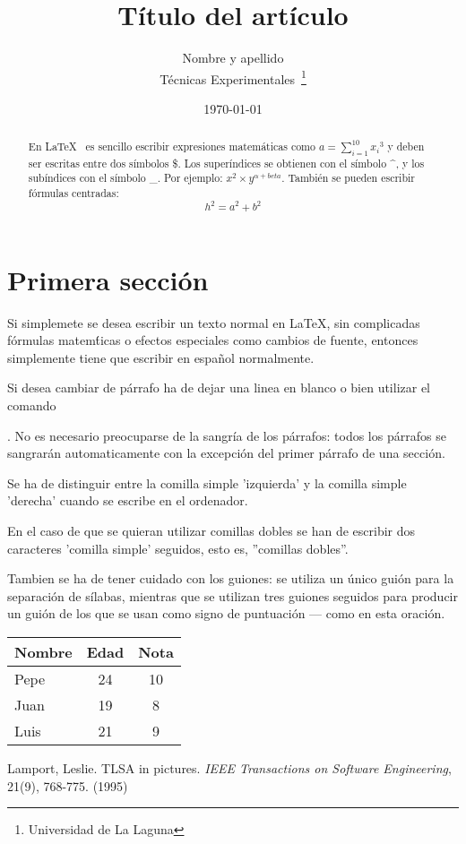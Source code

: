 \documentclass[a4paper,12pt]{article}
\begin{document}
\title{Título del artículo}
\author{Nombre y apellido \\
        Técnicas Experimentales~\footnote{Universidad de La Laguna}
        }
\date {\today}
\maketitle
\begin{abstract}
  En \LaTeX{}~\cite{Lam:86} es sencillo escribir expresiones
  matemáticas como $a=\sum_{i=1}^{10} {x_i}^{3}$
  y deben ser escritas entre dos símbolos \$.
  Los superíndices se obtienen con el símbolo \^{}, y
  los subíndices con el símbolo \_.
  Por ejemplo: $x^2 \times y^{\alpha + beta}$.
  También se pueden escribir fórmulas centradas:
  \[h^2=a^2 + b^2 \]
\end{abstract}

\section{Primera sección}
  
Si simplemete se desea escribir un texto normal en LaTeX,
sin complicadas f\'ormulas matem\'ticas o efectos especiales
como cambios de fuente, entonces simplemente tiene que escribir
en espa\~nol normalmente.\par
Si desea cambiar de párrafo ha de dejar una linea en blanco o bien
utilizar el comando\par.
No es necesario preo\-cu\-parse de la san\-gría de los pá\-rra\-fos:
todos los párrafos se sangrarán automaticamente con la excepción
del primer párrafo de una sección.

Se ha de distinguir entre la comilla simple 'izquierda'
y la comilla simple 'derecha' cuando se escribe en el ordenador.

En el caso de que se quieran utilizar comillas dobles se han de
escribir dos caracteres 'comilla simple' seguidos, esto es,
''comillas dobles''.

Tambien se ha de tener cuidado con los guiones: se utiliza un único
guión para la separación de sílabas, mientras que se utilizan
tres guiones seguidos para producir un guión de los que se usan
como signo de puntuación --- como en esta oración.

\bigskip
\begin{tabular}{|l|c|c|}
\hline
  Nombre & Edad & Nota \\ \hline
  Pepe   &   24 &   10 \\ \hline
  Juan   &   19 &    8 \\ \hline
  Luis   &   21 &    9 \\ \hline
\end{tabular}

\begin{thebibliography}{00}
  Lamport, Leslie.
  TLSA in pictures.
  \emph{IEEE Transactions on Software Engineering},
  21(9), 768-775.
  (1995)
\end{thebibliography}
\end{document}

